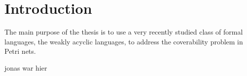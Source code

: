 \chapter{Introduction}\label{chapter:introduction}

The main purpose of the thesis is to use a very recently studied class of formal languages, the weakly acyclic languages, to address the coverability problem in Petri nets. 

jonas war hier